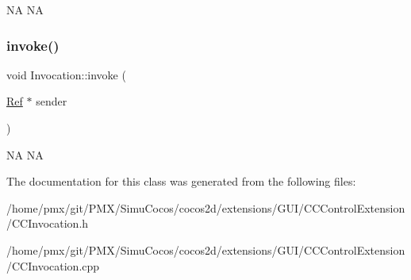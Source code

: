 NA  NA \mbox{\label{classInvocation_a4f3ed4c727f5737ba2fe94df53bd4a37}} 
\subsubsection{\texorpdfstring{invoke()}{invoke()}\hspace{0.1cm}{\footnotesize\ttfamily [2/2]}}
{\footnotesize\ttfamily void Invocation\+::invoke (\begin{DoxyParamCaption}\item[{\hyperlink{classRef}{Ref} $\ast$}]{sender }\end{DoxyParamCaption})}

NA  NA 

The documentation for this class was generated from the following files\+:\begin{DoxyCompactItemize}
\item 
/home/pmx/git/\+P\+M\+X/\+Simu\+Cocos/cocos2d/extensions/\+G\+U\+I/\+C\+C\+Control\+Extension/C\+C\+Invocation.\+h\item 
/home/pmx/git/\+P\+M\+X/\+Simu\+Cocos/cocos2d/extensions/\+G\+U\+I/\+C\+C\+Control\+Extension/C\+C\+Invocation.\+cpp\end{DoxyCompactItemize}
